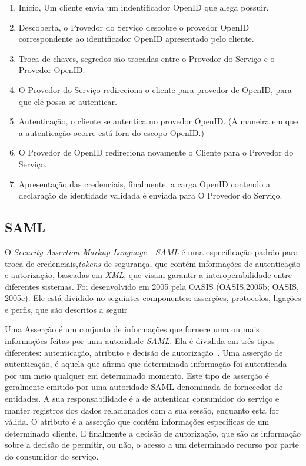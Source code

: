 \begin{enumerate}[1 )]
\item  Início, Um cliente envia um indentificador OpenID que alega possuir.

\item  Descoberta, o Provedor do Serviço descobre o provedor OpenID correspondente ao identificador OpenID apresentado pelo cliente.

\item Troca de chaves,  segredos são trocadas entre o Provedor do Serviço e o Provedor OpenID.

\item O Provedor do Serviço redireciona o cliente para provedor de OpenID, para que ele possa se autenticar.

\item Autenticação, o cliente se autentica no provedor OpenID. (A maneira em que a autenticação ocorre está fora do escopo OpenID.)

\item O Provedor de OpenID redireciona novamente o Cliente para o Provedor do Serviço.

\item Apresentação das credenciais, finalmente, a carga OpenID contendo a declaração de identidade validada é enviada para O Provedor do Serviço.

\end{enumerate}

\subsection{SAML}

O \emph{Security Assertion Markup Language - SAML} é uma especificação padrão para troca de credenciais,\emph{tokens} de segurança, que contém informações de autenticação e autorização, baseadas em \emph{XML}, que visam garantir a interoperabilidade entre diferentes sistemas. Foi desenvolvido em 2005 pela OASIS (OASIS,2005b; OASIS, 2005c). Ele está dividido no seguintes componentes: asserções, protocolos, ligações e perfis, que são descritos a seguir~\cite{Madsen2005}

Uma Asserção é um conjunto de informações que fornece uma ou mais informações feitas por uma autoridade \emph{SAML}. Ela é dividida em três tipos diferentes:  autenticação, atributo e decisão de autorização~\cite{Madsen2005,Nordbotten09,Bertino2010}. Uma asserção de autenticação, é aquela que afirma que determinada informação foi autenticada por um meio qualquer em determinado momento. Este tipo de asserção é geralmente emitido por uma autoridade SAML denominada de fornecedor de entidades. A sua responsabilidade é a de autenticar consumidor do serviço e manter registros dos dados relacionados com a sua sessão, enquanto esta for válida. O atributo é a asserção que contém informações específicas de um determinado cliente. E finalmente a decisão de autorização, que são as informação sobre a decisão de permitir, ou não, o acesso a um determinado recurso por parte do consumidor do serviço.

